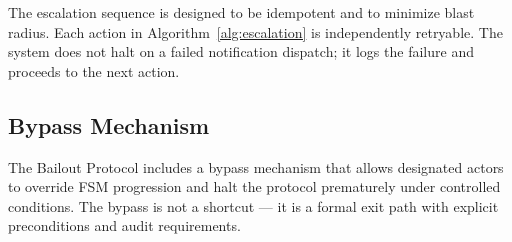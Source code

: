 The escalation sequence is designed to be idempotent and to minimize blast radius. Each action in Algorithm~\ref{alg:escalation} is independently retryable. The system does not halt on a failed notification dispatch; it logs the failure and proceeds to the next action.

\bigskip
\subsection{Bypass Mechanism}

The Bailout Protocol includes a bypass mechanism that allows designated actors to override FSM progression and halt the protocol prematurely under controlled conditions. The bypass is not a shortcut — it is a formal exit path with explicit preconditions and audit requirements.

